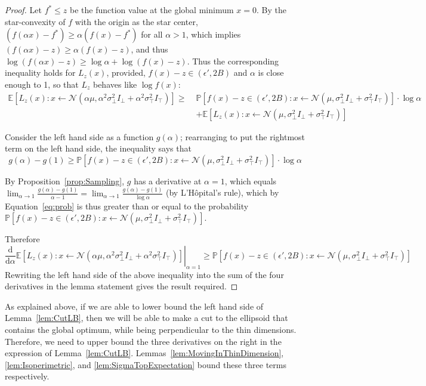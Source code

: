 \documentclass[11pt,letter]{article}
\renewcommand{\Pr}{\mathbb{P}}
\newcommand{\Exp}{\mathbb{E}}
\newcommand{\from}{\leftarrow}
\newcommand{\Normal}{\mathcal{N}}
\renewcommand{\d}{\mathrm{d}}
\newcommand{\Diff}[2][]{\frac{\d#1}{\d#2}}
\numberwithin{nTheorems}{section}
\begin{document}
\begin{proof}
Let $f^\ast\leq z$ be the function value at the global minimum $x=0$. By the star-convexity of $f$ with the origin as the star center, $(f(\alpha x)-f^\ast) \ge \alpha (f(x)-f^\ast)$ for all $\alpha > 1$, which implies $(f(\alpha x)-z) \ge \alpha (f(x)-z)$, and thus $\log (f(\alpha x)-z)\ge \log\alpha+\log (f(x)-z)$. Thus the corresponding inequality holds for $L_z(x)$, provided, $f(x)-z\in (\epsilon',2B)$ and $\alpha$ is close enough to 1, so that $L_z$ behaves like $\log f(x)$:
\begin{align*}
\Exp\left[L_z(x) : x \from \Normal(\alpha \mu, \alpha^2\sigma_\bot^2 I_\bot + \alpha^2\sigma_\top^2 I_\top) \right] \geq\;&\Pr[f(x)-z\in (\epsilon',2B) :x \from \Normal(\mu, \sigma_\bot^2 I_\bot + \sigma_\top^2 I_\top)] \cdot   \log \alpha\\&+\Exp\left[L_z(x) : x \from \Normal(\mu, \sigma_\bot^2 I_\bot + \sigma_\top^2 I_\top) \right]\end{align*}

Consider the left hand side as a function $g(\alpha)$; rearranging to put the rightmost term on the left hand side, the inequality says that \begin{equation}\label{eq:prob}g(\alpha)-g(1)\geq \Pr[f(x)-z\in (\epsilon',2B) :x \from \Normal(\mu, \sigma_\bot^2 I_\bot + \sigma_\top^2 I_\top)] \cdot   \log \alpha\end{equation}

By Proposition~\ref{prop:Sampling}, $g$ has a derivative at $\alpha=1$, which equals $\lim_{\alpha\to 1}\frac{g(\alpha)-g(1)}{\alpha-1}=\lim_{\alpha\to 1}\frac{g(\alpha)-g(1)}{\log \alpha}$ (by L'H\^{o}pital's rule), which by Equation~\ref{eq:prob} is thus greater than or equal to the probability $\Pr[f(x)-z\in (\epsilon',2B) :x \from \Normal(\mu, \sigma_\bot^2 I_\bot + \sigma_\top^2 I_\top)]$.



Therefore
$$ \left.\Diff{\alpha} \Exp\left[L_z(x) : x \from \Normal(\alpha \mu, \alpha^2\sigma_\bot^2 I_\bot + \alpha^2\sigma_\top^2 I_\top) \right]\right|_{\alpha = 1} \ge \Pr[f(x)-z\in (\epsilon',2B)  : x \from \Normal(\mu, \sigma_\bot^2 I_\bot + \sigma_\top^2 I_\top)] $$
Rewriting the left hand side of the above inequality into the sum of the four derivatives in the lemma statement gives the result required.
\end{proof}

As explained above, if we are able to lower bound the left hand side of Lemma~\ref{lem:CutLB}, then we will be able to make a cut to the ellipsoid that contains the global optimum, while being perpendicular to the thin dimensions.
Therefore, we need to upper bound the three derivatives on the right in the expression of Lemma~\ref{lem:CutLB}.
Lemmas~\ref{lem:MovingInThinDimension}, \ref{lem:Isoperimetric}, and \ref{lem:SigmaTopExpectation} bound these three terms respectively.
\end{document}
